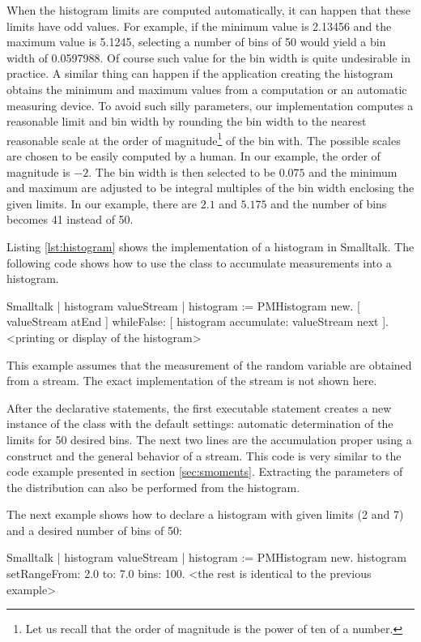 When the histogram limits are computed automatically, it can
happen that these limits have odd values. For example, if the
minimum value is 2.13456 and the maximum value is 5.1245,
selecting a number of bins of 50 would yield a bin width of
0.0597988. Of course such value for the bin width is quite
undesirable in practice. A similar thing can happen if the
application creating the histogram obtains the minimum and maximum
values from a computation or an automatic measuring device. To
avoid such silly parameters, our implementation computes a
reasonable limit and bin width by rounding the bin width to the
nearest reasonable scale at the order of magnitude\footnote{Let us
recall that the order of magnitude is the power of ten of a
number.} of the bin with.
The possible scales are chosen to be easily computed by a human. In our example, the order of magnitude
is $-2$.
The bin width is then selected to be $0.075$ and the minimum and maximum are adjusted to be integral multiples of the bin width enclosing the given limits.
In our example, there are $2.1$ and $5.175$ and the number of bins becomes 41 instead of 50.

\label{sec:shistogram} Listing \ref{lst:histogram} shows the
implementation of a histogram in Smalltalk. The following code
shows how to use the class  to accumulate
measurements into a histogram.
\begin{displaycode}{Smalltalk}
 | histogram valueStream |
 histogram := PMHistogram new.
 [ valueStream atEnd ]
 whileFalse: [ histogram accumulate: valueStream next ].
 <printing or display of the histogram>
\end{displaycode}

This example assumes that the measurement of the random variable
are obtained from a stream.
The exact implementation of the stream is not shown here.

After the declarative statements, the first executable statement
creates a new instance of the class  with the
default settings: automatic determination of the limits for 50
desired bins.
The next two lines are the accumulation proper using a  construct and the general behavior of a
stream.
This code is very similar to the code example presented in section \ref{sec:smoments}.
Extracting the parameters of the distribution can also be performed from the histogram.

\noindent The next example shows how to declare a histogram with
given limits (2 and 7) and a desired number of bins of 50:
\begin{displaycode}{Smalltalk}
 | histogram valueStream |
 histogram := PMHistogram new.
 histogram setRangeFrom: 2.0 to: 7.0 bins: 100.
 <the rest is identical to the previous example>
\end{displaycode}

